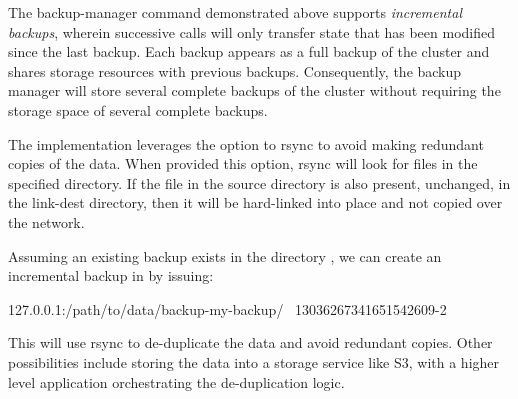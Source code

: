 The backup-manager command demonstrated above supports {\em incremental
backups}, wherein successive calls will only transfer state that has been
modified since the last backup.  Each backup appears as a full backup of the
cluster and shares storage resources with previous backups.  Consequently, the
backup manager will store several complete backups of the cluster without
requiring the storage space of several complete backups.

The implementation leverages the  option to rsync to avoid
making redundant copies of the data.  When provided this option, rsync will look
for files in the specified directory.  If the file in the source directory is
also present, unchanged, in the link-dest directory, then it will be hard-linked
into place and not copied over the network.

Assuming an existing backup exists in the directory
,
we can create an incremental backup in  by issuing:

\begin{consolecode}
    127.0.0.1:/path/to/data/backup-my-backup/ \
    13036267341651542609-2
\end{consolecode}

This will use rsync to de-duplicate the data and avoid redundant copies.  Other
possibilities include storing the data into a storage service like S3, with a
higher level application orchestrating the de-duplication logic.
